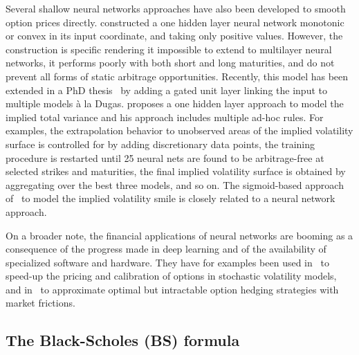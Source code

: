 Several shallow neural networks approaches have also been developed to smooth option prices directly.
\cite{dugas2001incorporating} constructed a one hidden layer neural network monotonic or convex in its input coordinate, and taking only positive values.
However, the construction is specific rendering it impossible to extend to multilayer neural networks, it performs poorly with both short and long maturities, and do not prevent all forms of static arbitrage opportunities.
Recently, this model has been extended in a PhD thesis~\cite{zheng2018machine} by adding a gated unit layer linking the input to multiple models \`a la Dugas.
\cite{ludwig2015robust} proposes a one hidden layer approach to model the implied total variance and his approach includes multiple ad-hoc rules.
For examples, 
the extrapolation behavior to unobserved areas of the implied volatility surface is controlled for by adding discretionary data points, 
the training procedure is restarted until 25 neural nets are found to be arbitrage-free at selected strikes and maturities,
the final implied volatility surface is obtained by aggregating over the best three models,
and so on.
The sigmoid-based approach of~\cite{itkin2015sigmoid} to model the implied volatility smile is closely related to a neural network approach.

On a broader note, the financial applications of neural networks are booming as a consequence of the progress made in deep learning and of the availability of specialized software and hardware.
They have for examples been used in~\cite{liu2019neural,liu2019pricing} to speed-up the pricing and calibration of options in stochastic volatility models, and in~\cite{buehler2019deep} to approximate optimal but intractable option hedging strategies with market frictions.

\subsection{The Black-Scholes (BS) formula} \label{sec:app_bs}

